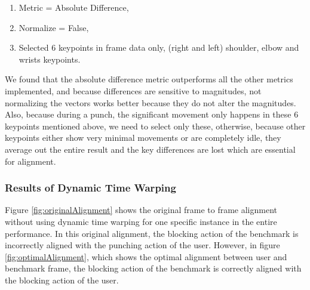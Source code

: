 \begin{enumerate}
  \item Metric = Absolute Difference,
  \item  Normalize = False,
  \item Selected 6 keypoints in frame data only, (right and left) shoulder, elbow and wrists keypoints.
\end{enumerate}

We found that the absolute difference metric outperforms all the other metrics implemented, and because differences are sensitive to magnitudes, not normalizing the vectors works better because they do not alter the magnitudes. Also, because during a punch, the significant movement only happens in these 6 keypoints mentioned above, we need to select only these, otherwise, because other keypoints either show very minimal movements or are completely idle, they average out the entire result and the key differences are lost which are essential for alignment.

\subsubsection{Results of Dynamic Time Warping}

Figure \ref{fig:originalAlignment} shows the original frame to frame alignment without using dynamic time warping for one specific instance in the entire performance. In this original alignment, the blocking action of the benchmark is incorrectly aligned with the punching action of the user. 
However, in figure \ref{fig:optimalAlignment}, which shows the optimal alignment between user and benchmark frame, the blocking action of the benchmark is correctly aligned with the blocking action of the user. 

